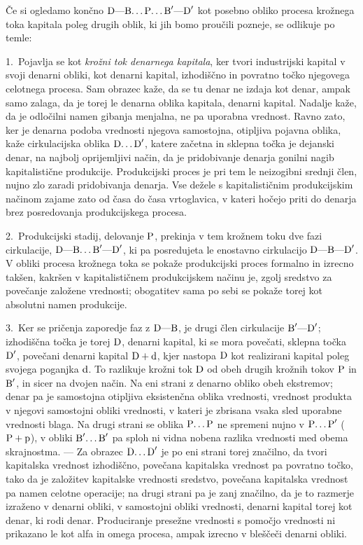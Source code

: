 \documentclass[kapital_02.tex]{subfiles}
\begin{document}
Če si ogledamo končno \( \textrm{D}\textrm{---}\textrm{B}\textrm{\dots}\textrm{P}\textrm{\dots}\textrm{B}'\textrm{---}\textrm{D}' \) kot posebno obliko procesa krožnega toka kapitala poleg drugih oblik, ki jih bomo proučili pozneje, se odlikuje po temle:

1.\ Pojavlja se kot \emph{krožni tok denarnega kapitala}, ker tvori industrijski kapital v svoji denarni obliki, kot denarni kapital, izhodiščno in povratno točko njegovega celotnega procesa. Sam obrazec kaže, da se tu denar ne izdaja kot denar, ampak samo zalaga, da je torej le denarna oblika kapitala, denarni kapital. Nadalje kaže, da je odločilni namen gibanja menjalna, ne pa uporabna vrednost. Ravno zato, ker je denarna podoba vrednosti njegova samostojna, otipljiva pojavna oblika, kaže cirkulacijska oblika \( \textrm{D}\textrm{\dots}\textrm{D}' \), katere začetna in sklepna točka je dejanski denar, na najbolj oprijemljivi način, da je pridobivanje denarja gonilni nagib kapitalistične produkcije. Produkcijski proces je pri tem le neizogibni srednji člen, nujno zlo zaradi pridobivanja denarja. Vse dežele s kapitalističnim produkcijskim načinom zajame zato od časa do časa vrtoglavica, v kateri hočejo priti do denarja brez posredovanja produkcijskega procesa.

2.\ Produkcijski stadij, delovanje \( \textrm{P} \), prekinja v tem krožnem toku dve fazi cirkulacije, \( \textrm{D}\textrm{---}\textrm{B}\textrm{\dots}\textrm{B}'\textrm{---}\textrm{D}' \), ki pa posredujeta le enostavno cirkulacijo \( \textrm{D}\textrm{---}\textrm{B}\textrm{---}\textrm{D}' \). V obliki procesa krožnega toka se pokaže produkcijski proces formalno in izrecno takšen, kakršen v kapitalističnem produkcijskem načinu je, zgolj sredstvo za povečanje založene vrednosti; obogatitev sama po sebi se pokaže torej kot absolutni namen produkcije.

3.\ Ker se pričenja zaporedje faz z \( \textrm{D}\textrm{---}\textrm{B} \), je drugi člen cirkulacije \( \textrm{B}'\textrm{---}\textrm{D}' \); izhodiščna točka je torej \( \textrm{D} \), denarni kapital, ki se mora povečati, sklepna točka \( \textrm{D}' \), povečani denarni kapital \( \textrm{D} + \textrm{d} \), kjer nastopa \( \textrm{D} \) kot realizirani kapital poleg svojega poganjka \( \textrm{d} \). To razlikuje krožni tok \( \textrm{D} \) od obeh drugih krožnih tokov \( \textrm{P} \) in \( \textrm{B}' \), in sicer na dvojen način. Na eni strani z denarno obliko obeh ekstremov; denar pa je samostojna otipljiva eksistenčna oblika vrednosti, vrednost produkta v njegovi samostojni obliki vrednosti, v kateri je zbrisana vsaka sled uporabne vrednosti blaga. Na drugi strani se oblika \( \textrm{P}\textrm{\dots}\textrm{P} \) ne spremeni nujno v \( \textrm{P}\textrm{\dots}\textrm{P}' \) (\( \textrm{P} + \textrm{p} \)), v obliki \( \textrm{B}'\textrm{\dots}\textrm{B}' \) pa sploh ni vidna nobena razlika vrednosti med obema skrajnostma. --- Za obrazec \( \textrm{D}\textrm{\dots}\textrm{D}' \) je po eni strani torej značilno, da tvori kapitalska vrednost izhodiščno, povečana kapitalska vrednost pa povratno točko, tako da je založitev kapitalske vrednosti sredstvo, povečana kapitalska vrednost pa namen celotne operacije; na drugi strani pa je zanj značilno, da je to razmerje izraženo v denarni obliki, v samostojni obliki vrednosti, denarni kapital torej kot denar, ki rodi denar. Produciranje presežne vrednosti s pomočjo vrednosti ni prikazano le kot alfa in omega procesa, ampak izrecno v bleščeči denarni obliki.
\end{document}
